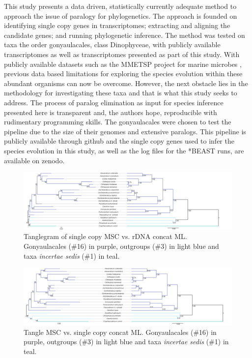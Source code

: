 \documentclass[12pt]{article}
\begin{document}
This study presents a data driven, statistically currently adequate method to approach the issue of paralogy for phylogenetics. 
The approach is founded on identifying single copy genes in transcriptomes; extracting and aligning the candidate genes; and running phylogenetic inference. 
The method was tested on taxa the order gonyaulacales, class Dinophyceae, with publicly available transcriptomes as well as transcriptomes presented as part of this study. 
With publicly available datasets such as the MMETSP project for marine microbes \cite{keeling2014marine}, previous data based limitations for exploring the species evolution within these abundant organisms can now be overcome. 
However, the next obstacle lies in the methodology for investigating these taxa and that is what this study seeks to address. 
The process of paralog elimination as input for species inference presented here is transparent and, the authors hope, reproducible with rudimentary programming skills. 
The gonyaulacales were chosen to test the pipeline due to the size of their genomes and extensive paralogs.
This pipeline is publicly available through github and the single copy genes used to infer the species evolution in this study, as well as the log files for the *BEAST runs, are available on zenodo.

\FloatBarrier 
\begin{figure} 
\includegraphics[scale=.23]{figures/MSC-BI_vs_rDNA-ML.png} 
\caption{Tanglegram of single copy MSC vs. rDNA concat ML. Gonyaulacales (\#16) in purple, outgroups (\#3) in light blue and taxa \textit{incertae sedis} (\#1) in teal.} 
\label{fig:tanglerDNA}
\end{figure} 
\FloatBarrier

\FloatBarrier 
\begin{figure} 
\includegraphics[scale=.23]{figures/MSC-BI_vs_singlecopy-concat-ML.png} 
\caption{Tangle MSC vs. single copy concat ML. Gonyaulacales (\#16) in purple, outgroups (\#3) in light blue and taxa \textit{incertae sedis} (\#1) in teal.} 
\label{fig:tangleconcatML}
\end{figure} 
\FloatBarrier
\end{document}
